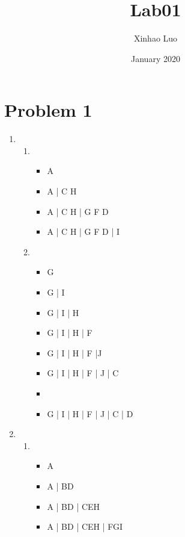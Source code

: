 \documentclass{article}
\title{Lab01}
\author{Xinhao Luo}
\date{January 2020}
\begin{document}
\maketitle

\section{Problem 1}

\begin{enumerate}[1)]
    \item 
        \begin{enumerate}[1)]
            \item 
                \begin{itemize}
                    \item A
                    \item A | C H
                    \item A | C H | G F D
                    \item A | C H | G F D | I
                \end{itemize}
            \item 
                \begin{itemize}
                    \item G 
                    \item G | I 
                    \item G | I | H
                    \item G | I | H | F
                    \item G | I | H | F |J
                    \item G | I | H | F | J | C
                    \item \item G | I | H | F | J | C | D
                \end{itemize}
        \end{enumerate}
    \item 
        \begin{enumerate}[1)]
            \item 
                \begin{itemize}
                    \item A 
                    \item A | BD
                    \item A | BD | CEH
                    \item A | BD | CEH | FGI
                \end{itemize}

\end{enumerate}
\end{enumerate}
\end{document}
